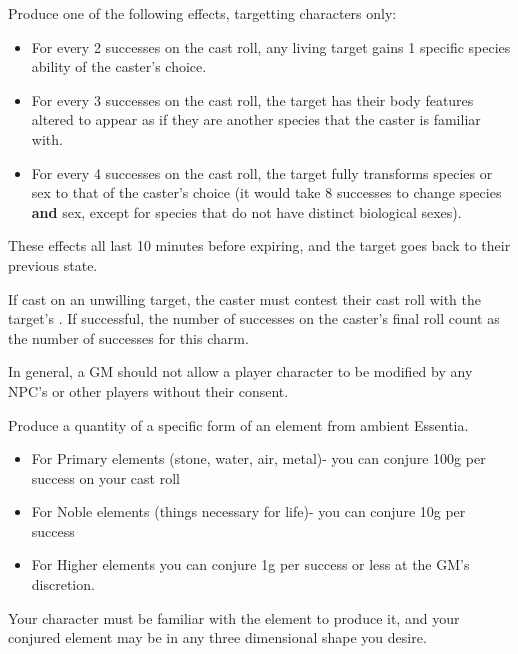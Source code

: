 \begin{GRPtablewide}
	\caption{All Casts with a Wt 2 Focus}

	{%
		Produce one of the following effects, targetting characters only:
		\begin{itemize}
	 		\item For every 2 successes on the cast roll, any living target gains 1 specific species ability of the caster's choice.
	 		\item For every 3 successes on the cast roll, the target has their body features altered to appear as if they are another species that the caster is familiar with.
	 		\item For every 4 successes on the cast roll, the target fully transforms species or sex to that of the caster's choice (it would take 8 successes to change species \textbf{and} sex, except for species that do not have distinct biological sexes).
	 	\end{itemize}

	 	These effects all last 10 minutes before expiring, and the target goes back to their previous state.

	 	If cast on an unwilling target, the caster must contest their cast roll with the target's . If successful, the number of successes on the caster's final roll count as the number of successes for this charm.

	 	In general, a GM should not allow a player character to be modified by any NPC's or other players without their consent.
	}

	{%
		Produce a quantity of a specific form of an element from ambient Essentia. 

		\begin{itemize}
			\item For Primary elements (stone, water, air, metal)- you can conjure 100g per success on your cast roll
			\item For Noble elements (things necessary for life)- you can conjure 10g per success
			\item For Higher elements you can conjure 1g per success or less at the GM's discretion.
		\end{itemize}

		Your character must be familiar with the element to produce it, and your conjured element may be in any three dimensional shape you desire.

}
\end{GRPtablewide}
